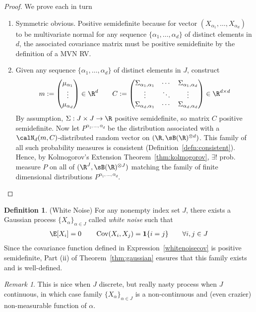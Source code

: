 \documentclass[12pt]{article}
\theoremstyle{plain}
\theoremstyle{definition}
\newtheorem{defn}[thm]{Definition}
\theoremstyle{remark}
\newtheorem*{rmk}{Remark}
\newcommand{\ra}{\rightarrow}
\newcommand{\Cov}{\operatorname{Cov}}
\begin{document}
\begin{proof}
We prove each in turn
\begin{enumerate}[label=(\roman*)]
  \item Symmetric obvious.
    Positive semidefinite because for vector $(X_{\alpha_1},\ldots,X_{\alpha_d})$
    to be multivariate normal for any sequence
    $\{\alpha_1,\ldots,\alpha_d\}$ of distinct elements in $d$, the associated
    covariance matrix must be positive semidefinite by the definition of
    a MVN RV.
  \item
    Given any sequence $\{\alpha_1,\ldots,\alpha_d\}$ of distinct
    elements in $J$, construct
    \begin{align*}
      m:=
      \begin{pmatrix}
        \mu_{\alpha_1} \\ \vdots \\ \mu_{\alpha_d}
      \end{pmatrix}
      \in \R^d
      \qquad
      C:=
      \begin{pmatrix}
        \Sigma_{\alpha_1,\alpha_1} & \cdots & \Sigma_{\alpha_1,\alpha_d}
        \\
        \vdots & \ddots &\vdots \\
        \Sigma_{\alpha_d,\alpha_1} & \cdots & \Sigma_{\alpha_d,\alpha_d}
      \end{pmatrix}
      \in\R^{d\times d}
    \end{align*}
    By assumption, $\Sigma:J\times J\ra\R$ positive semidefinite, so
    matrix $C$ positive semidefinite.
    Now let $P^{\alpha_1,\ldots,\alpha_d}$ be the distribution
    associated with a $\calN_d(m,C)$-distributed random vector on
    $(\R,\sB(\R)^{\otimes d})$.
    This family of all such probability measures is consistent
    (Definition~\ref{defn:consistent}).
    Hence, by Kolmogorov's Extension Theorem~\ref{thm:kolmogorov},
    $\exists !$ prob. measure $P$ on all of
    $(\R^J,\sB(\R)^{\otimes J})$
    matching the family of finite dimensional distributions
    $P^{\alpha_1,\ldots,\alpha_d}$.
\end{enumerate}
\end{proof}

\begin{defn}(White Noise)
For any nonempty index set $J$, there exists a Gaussian process
$\{X_\alpha\}_{\alpha\in J}$ called \emph{white noise} such that
\begin{align}
  \E[X_i]=0
  \qquad
  \Cov(X_i,X_j)
  =
  \mathbf{1}\{i=j\}
  \qquad\forall i,j\in J
  \label{whitenoisecov}
\end{align}
Since the covariance function defined in Expression~\ref{whitenoisecov}
is positive semidefinite, Part (ii) of Theorem~\ref{thm:gaussian}
ensures that this family exists and is well-defined.
\end{defn}
\begin{rmk}
This is nice when $J$ discrete, but really nasty process when $J$
continuous, in which case family $\{X_\alpha\}_{\alpha \in J}$ is a
non-continuous and (even crazier) non-measurable function of $\alpha$.
\end{rmk}
\end{document}
